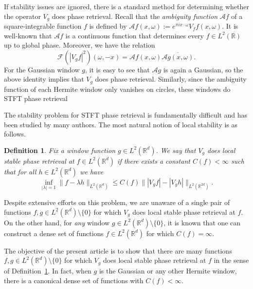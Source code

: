\documentclass[11pt]{amsart}
\newtheorem{definition}[theorem]{Definition}
\theoremstyle{remark}
\begin{document}
If stability issues are ignored, there is a standard method for determining whether the operator $V_g$ does phase retrieval. Recall that the \emph{ambiguity function} $\mathcal{A}f$  of a square-integrable function $f$ is defined by $\mathcal{A}f(x,\omega):=e^{\pi ix\cdot \omega} V_ff(x,\omega)$. It is well-known that $\mathcal{A}f$ is a continuous function that determines every $f\in L^2(\mathbb{R})$ up to global phase. Moreover, we have the relation 
\begin{equation*}\label{Ambiguity to STFT}
    \mathcal{F}\left( |V_g f|^2\right)(\omega,-x)=\mathcal{A}f(x,\omega) \overline{\mathcal{A}g(x,\omega)}.
\end{equation*}
For the Gaussian window $g$, it is easy to see that $\mathcal{A}g$ is again a Gaussian, so the above identity implies that $V_g$ does phase retrieval. Similarly, since the ambiguity function of each Hermite window only vanishes on circles, these windows  do STFT phase retrieval
\medskip

The stability problem for STFT phase retrieval is fundamentally difficult and has been studied by many authors. The most natural notion of local stability is as follows.
\begin{definition}\label{defn of local stability}
    Fix a window function $g\in L^2(\mathbb{R}^d)$. We say that $V_g$ does \emph{local stable phase retrieval at $f\in L^2(\mathbb{R}^d)$} if there exists a constant $C(f)<\infty$ such that for all $h\in L^2(\mathbb{R}^d)$ we have
    \begin{equation}\label{SPR local V_g}
        \inf_{|\lambda|=1}\|f-\lambda h\|_{L^2(\mathbb{R}^d)}\leq C(f) \| |V_g f|-|V_g h|\|_{L^2(\mathbb{R}^{2d})}.
    \end{equation}
\end{definition}
Despite extensive efforts on this problem, we are unaware of a single pair of functions $f,g\in L^2(\mathbb{R}^d)\setminus\{0\}$ for which $V_g$ does local stable phase retrieval at $f$. On the other hand, for \emph{any} window $g\in L^2(\mathbb{R}^d)\setminus\{0\}$, it is known \cite{alaifari2025cheeger,Alharbi2024Locality} that one can construct a dense set of functions $f\in L^2(\mathbb{R}^d)$ for which $C(f)=\infty$. 
\medskip

The objective of the present article is to show that there are many functions $f,g\in L^2(\mathbb{R}^d)\setminus\{0\}$ for which $V_g$ does local stable phase retrieval at $f$ in the sense of Definition~\ref{defn of local stability}. In fact, when $g$ is the Gaussian or any other Hermite window, there is a  canonical dense set of functions with $C(f)<\infty.$
\end{document}
